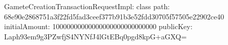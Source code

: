 \begin{shellbox}\begin{ttlst}
GameteCreationTransactionRequestImpl:
  class path: 68e90e2868751a3f22fd5fad3ceef377b91b3e52fdd30705f57505e22902ce40
  initialAmount: 10000000000000000000000000000
  publicKey: Laph93em9g3PZwfjS4NYNfJ4lGtEBq0pgd8kpG+aGXQ=
\end{ttlst}\end{shellbox}
